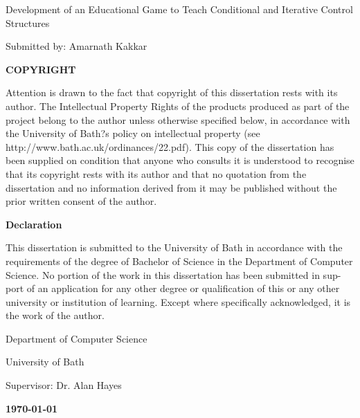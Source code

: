 \documentclass[a4paper,11.5pt]{report}
\numberwithin{figure}{section}
\numberwithin{table}{section}
\numberwithin{equation}{section}
\numberwithin{equation}{section}
\begin{document}
\newpage



    
\clearpage\thispagestyle{empty}
\begin{center}
\begin{minipage}{1\linewidth}
    \vspace{0.8cm}
    {\LARGE Development of an Educational Game to Teach Conditional and Iterative Control Structures \par}
    \vspace{1cm}	
    {\large Submitted by: Amarnath Kakkar\par}
	
    \vspace{1cm}
    {\Large \textbf{COPYRIGHT}\par}
    \vspace{0.5cm}
    {Attention is drawn to the fact that copyright of this dissertation rests with its author. The Intellectual Property Rights of the products produced as part of the project belong to the author unless otherwise specified below, in accordance with the University of Bath?s policy on intellectual property
(see http://www.bath.ac.uk/ordinances/22.pdf).
This copy of the dissertation has been supplied on condition that anyone who consults it is understood to recognise that its copyright rests with its author and that no quotation from the dissertation and no information derived from it may be published without the prior written consent of the author.\par}

     \vspace{0.5cm}
     {\Large \textbf{Declaration}\par}
      \vspace{0.5cm}
      {This dissertation is submitted to the University of Bath in accordance with the requirements of the degree of Bachelor of Science in the Department of Computer Science. No portion of the work in this dissertation has been submitted in sup- port of an application for any other degree or qualification of this or any other university or institution of learning. Except where specifically acknowledged, it is the work of the author.\par}
    
     \vspace{3cm}
    {\large Department of Computer Science\par}
    {\large University of Bath\par}
    \vspace{0.5cm}
    {\large Supervisor: Dr. Alan Hayes}\par
    {\large \textbf{\monthyeardate\today}\par}
    \vspace{1cm}
\end{minipage}
\end{center}
\end{document}
